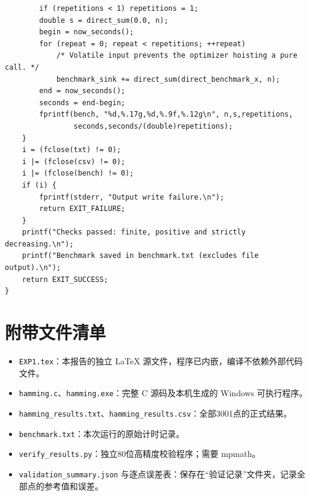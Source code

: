 \documentclass[UTF8,fontset=fandol,zihao=-4,a4paper]{ctexart}
\begin{document}
\begin{lstlisting}
        if (repetitions < 1) repetitions = 1;
        double s = direct_sum(0.0, n);
        begin = now_seconds();
        for (repeat = 0; repeat < repetitions; ++repeat)
            /* Volatile input prevents the optimizer hoisting a pure call. */
            benchmark_sink += direct_sum(direct_benchmark_x, n);
        end = now_seconds();
        seconds = end-begin;
        fprintf(bench, "%d,%.17g,%d,%.9f,%.12g\n", n,s,repetitions,
                seconds,seconds/(double)repetitions);
    }
    i = (fclose(txt) != 0);
    i |= (fclose(csv) != 0);
    i |= (fclose(bench) != 0);
    if (i) {
        fprintf(stderr, "Output write failure.\n");
        return EXIT_FAILURE;
    }
    printf("Checks passed: finite, positive and strictly decreasing.\n");
    printf("Benchmark saved in benchmark.txt (excludes file output).\n");
    return EXIT_SUCCESS;
}
\end{lstlisting}

\section{附带文件清单}
\begin{itemize}
 \item \texttt{EXP1.tex}：本报告的独立 LaTeX 源文件，程序已内嵌，编译不依赖外部代码文件。
 \item \texttt{hamming.c}、\texttt{hamming.exe}：完整 C 源码及本机生成的 Windows 可执行程序。
 \item \texttt{hamming\_results.txt}、\texttt{hamming\_results.csv}：全部3001点的正式结果。
 \item \texttt{benchmark.txt}：本次运行的原始计时记录。
 \item \texttt{verify\_results.py}：独立80位高精度校验程序；需要 mpmath。
 \item \texttt{validation\_summary.json} 与逐点误差表：保存在“验证记录”文件夹，记录全部点的参考值和误差。
\end{itemize}
\end{document}
